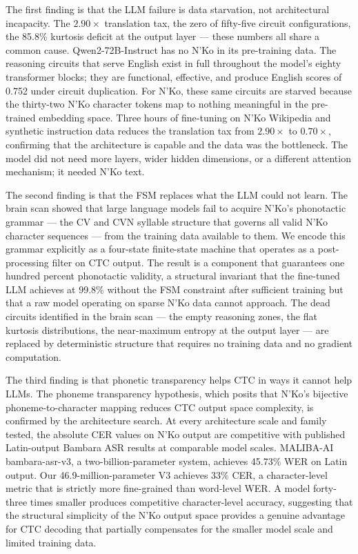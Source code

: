 \documentclass[11pt]{article}
\newcommand{\nko}{N'Ko}
\begin{document}
The first finding is that the LLM failure is data starvation, not architectural incapacity. The $2.90\times$ translation tax, the zero of fifty-five circuit configurations, the 85.8\% kurtosis deficit at the output layer --- these numbers all share a common cause. Qwen2-72B-Instruct has no \nko{} in its pre-training data. The reasoning circuits that serve English exist in full throughout the model's eighty transformer blocks; they are functional, effective, and produce English scores of 0.752 under circuit duplication. For \nko{}, these same circuits are starved because the thirty-two \nko{} character tokens map to nothing meaningful in the pre-trained embedding space. Three hours of fine-tuning on \nko{} Wikipedia and synthetic instruction data reduces the translation tax from $2.90\times$ to $0.70\times$, confirming that the architecture is capable and the data was the bottleneck. The model did not need more layers, wider hidden dimensions, or a different attention mechanism; it needed \nko{} text.

The second finding is that the FSM replaces what the LLM could not learn. The brain scan showed that large language models fail to acquire \nko{}'s phonotactic grammar --- the CV and CVN syllable structure that governs all valid \nko{} character sequences --- from the training data available to them. We encode this grammar explicitly as a four-state finite-state machine that operates as a post-processing filter on CTC output. The result is a component that guarantees one hundred percent phonotactic validity, a structural invariant that the fine-tuned LLM achieves at 99.8\% without the FSM constraint after sufficient training but that a raw model operating on sparse \nko{} data cannot approach. The dead circuits identified in the brain scan --- the empty reasoning zones, the flat kurtosis distributions, the near-maximum entropy at the output layer --- are replaced by deterministic structure that requires no training data and no gradient computation.

The third finding is that phonetic transparency helps CTC in ways it cannot help LLMs. The phoneme transparency hypothesis, which posits that \nko{}'s bijective phoneme-to-character mapping reduces CTC output space complexity, is confirmed by the architecture search. At every architecture scale and family tested, the absolute CER values on \nko{} output are competitive with published Latin-output Bambara ASR results at comparable model scales. MALIBA-AI bambara-asr-v3, a two-billion-parameter system, achieves 45.73\% WER on Latin output. Our 46.9-million-parameter V3 achieves 33\% CER, a character-level metric that is strictly more fine-grained than word-level WER. A model forty-three times smaller produces competitive character-level accuracy, suggesting that the structural simplicity of the \nko{} output space provides a genuine advantage for CTC decoding that partially compensates for the smaller model scale and limited training data.
\end{document}
